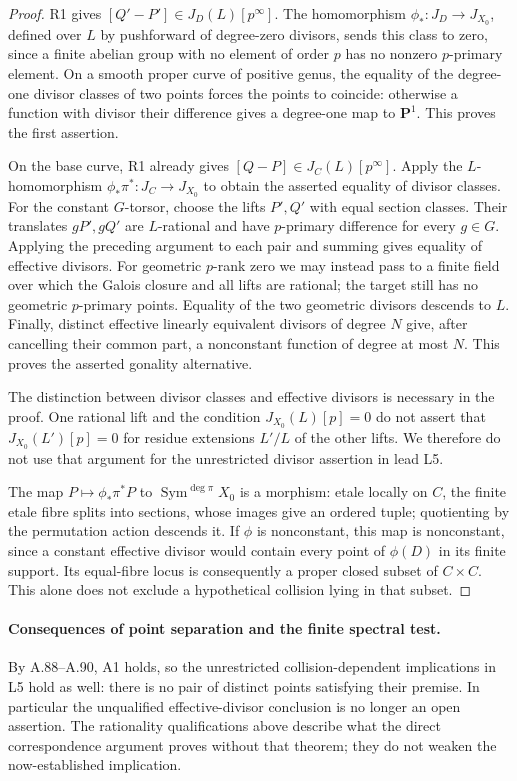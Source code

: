 \documentclass[11pt]{article}
\begin{document}
\begin{proof}
R1 gives $[Q'-P']\in J_D(L)[p^\infty]$. The homomorphism
$\phi_*:J_D\to J_{X_0}$, defined over $L$ by pushforward of
degree-zero divisors, sends this class to zero, since a finite
abelian group with no element of order $p$ has no nonzero
$p$-primary element. On a smooth proper curve of positive genus,
the equality of the degree-one divisor classes of two points
forces the points to coincide: otherwise a function with divisor
their difference gives a degree-one map to $\mathbf P^1$.
This proves the first assertion.

On the base curve, R1 already gives $[Q-P]\in J_C(L)[p^\infty]$.
Apply the $L$-homomorphism $\phi_*\pi^*:J_C\to J_{X_0}$ to
obtain the asserted equality of divisor classes. For the constant
$G$-torsor, choose the lifts $P',Q'$ with equal section classes.
Their translates $gP',gQ'$ are $L$-rational and have $p$-primary
difference for every $g\in G$. Applying the preceding argument
to each pair and summing gives equality of effective divisors.
For geometric $p$-rank zero we may instead pass to a finite field
over which the Galois closure and all lifts are rational; the
target still has no geometric $p$-primary points. Equality of
the two geometric divisors descends to $L$.
Finally, distinct effective linearly equivalent divisors of degree
$N$ give, after cancelling their common part, a nonconstant function
of degree at most $N$. This proves the asserted gonality alternative.

The distinction between divisor classes and effective divisors
is necessary in the proof. One rational lift and the condition
$J_{X_0}(L)[p]=0$ do not assert that
$J_{X_0}(L')[p]=0$ for residue extensions $L'/L$ of the other
lifts. We therefore do not use that argument for the unrestricted
divisor assertion in lead L5.

The map $P\mapsto\phi_*\pi^*P$ to $\operatorname{Sym}^{\deg\pi}X_0$
is a morphism: etale locally on $C$, the finite etale fibre splits
into sections, whose images give an ordered tuple; quotienting by
the permutation action descends it. If $\phi$ is nonconstant, this
map is nonconstant, since a constant effective divisor would contain
every point of $\phi(D)$ in its finite support. Its equal-fibre locus
is consequently a proper closed subset of $C\times C$. This alone
does not exclude a hypothetical collision lying in that subset.
\end{proof}

\paragraph{Consequences of point separation and the finite spectral test.}
By A.88--A.90, A1 holds, so the unrestricted collision-dependent
implications in L5 hold as well: there is no pair of distinct
points satisfying their premise. In particular the unqualified
effective-divisor conclusion is no longer an open assertion.
The rationality qualifications above describe what the direct
correspondence argument proves without that theorem; they do
not weaken the now-established implication.
\end{document}
